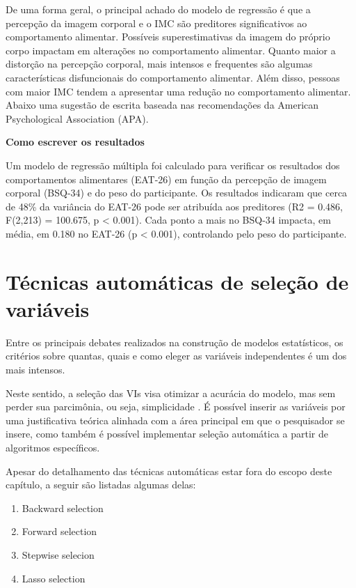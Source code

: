 \documentclass[
]{book}
\providecommand{\tightlist}{%
  \setlength{\itemsep}{0pt}\setlength{\parskip}{0pt}}
\begin{document}
De uma forma geral, o principal achado do modelo de regressão é que a percepção da imagem corporal e o IMC são preditores significativos ao comportamento alimentar. Possíveis superestimativas da imagem do próprio corpo impactam em alterações no comportamento alimentar. Quanto maior a distorção na percepção corporal, mais intensos e frequentes são algumas características disfuncionais do comportamento alimentar. Além disso, pessoas com maior IMC tendem a apresentar uma redução no comportamento alimentar. Abaixo uma sugestão de escrita baseada nas recomendações da American Psychological Association (APA).

\textbf{Como escrever os resultados}

Um modelo de regressão múltipla foi calculado para verificar os resultados dos comportamentos alimentares (EAT-26) em função da percepção de imagem corporal (BSQ-34) e do peso do participante. Os resultados indicaram que cerca de 48\% da variância do EAT-26 pode ser atribuída aos preditores (R2 = 0.486, F(2,213) = 100.675, p \textless{} 0.001). Cada ponto a mais no BSQ-34 impacta, em média, em 0.180 no EAT-26 (p \textless{} 0.001), controlando pelo peso do participante.

\hypertarget{tuxe9cnicas-automuxe1ticas-de-seleuxe7uxe3o-de-variuxe1veis}{%
\section{Técnicas automáticas de seleção de variáveis}\label{tuxe9cnicas-automuxe1ticas-de-seleuxe7uxe3o-de-variuxe1veis}}

Entre os principais debates realizados na construção de modelos estatísticos, os critérios sobre quantas, quais e como eleger as variáveis independentes é um dos mais intensos.

Neste sentido, a seleção das VIs visa otimizar a acurácia do modelo, mas sem perder sua parcimônia, ou seja, simplicidade \citep{Unger1973, Gaudio2001}. É possível inserir as variáveis por uma justificativa teórica alinhada com a área principal em que o pesquisador se insere, como também é possível implementar seleção automática a partir de algoritmos específicos.

Apesar do detalhamento das técnicas automáticas estar fora do escopo deste capítulo, a seguir são listadas algumas delas:

\begin{enumerate}
\def\labelenumi{\arabic{enumi}.}
\tightlist
\item
  Backward selection\\
\item
  Forward selection\\
\item
  Stepwise selecion\\
\item
  Lasso selection
\end{enumerate}
\end{document}

